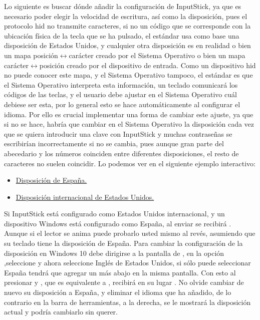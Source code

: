 Lo siguiente es buscar dónde añadir la configuración de InputStick, ya que es necesario poder elegir la velocidad de escritura, así como la disposición, pues el protocolo \gls{hid} no transmite caracteres, si no un código que se corresponde con la ubicación física de la tecla que se ha pulsado, el estándar usa como base una disposición de Estados Unidos, y cualquier otra disposición es en realidad o bien un mapa posición$\longleftrightarrow$carácter creado por el Sistema Operativo o bien un mapa carácter$\longleftrightarrow$posición creado por el dispositivo de entrada\cite{microsofthid}\cite{usbhid}. Como un dispositivo \gls{hid} no puede conocer este mapa, y el Sistema Operativo tampoco, el estándar es que el Sistema Operativo interpreta esta información, un teclado comunicará los códigos de las teclas, y el usuario debe ajustar en el Sistema Operativo cuál debiese ser esta, por lo general esto se hace automáticamente al configurar el idioma\cite{microsoftchangelayout}. Por ello es crucial implementar una forma de cambiar este ajuste, ya que si no se hace, habría que cambiar en el Sistema Operativo la disposición cada vez que se quiera introducir una clave con InputStick y muchas contraseñas se escribirían incorrectamente si no se cambia, pues aunque gran parte del abecedario y los números coinciden entre diferentes disposiciones, el resto de caracteres no suelen coincidir. Lo podemos ver en el siguiente ejemplo interactivo:
\begin{itemize}
    \item \hyperlink{https://learn.microsoft.com/en-us/globalization/keyboards/kbdsp}{Disposición de España.}
    \item \hyperlink{https://learn.microsoft.com/en-us/globalization/keyboards/kbdusx}{Disposición internacional de Estados Unidos.}
\end{itemize}
Si InputStick está configurado como Estados Unidos internacional, y un dispositivo Windows está configurado como España, al enviar \quotes{\#} se recibirá . Aunque si el lector se anima puede probarlo usted mismo al revés, asumiendo que su teclado tiene la disposición de España. Para cambiar la configuración de la disposición en Windows 10 debe dirigirse a la pantalla de , en la opción ,seleccione  y ahora seleccione Inglés de Estados Unidos, si sólo puede seleccionar España tendrá que agregar un  más abajo en la misma pantalla. Con esto al presionar  y , que es equivalente a , recibirá en su lugar \quotes{\#}. No olvide cambiar de nuevo su disposición a España, y eliminar el idioma que ha añadido, de lo contrario en la barra de herramientas, a la derecha, se le mostrará la disposición actual y podría cambiarlo sin querer.

